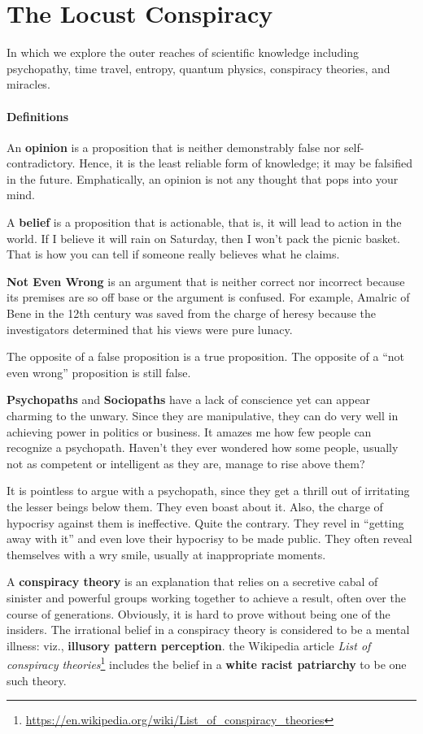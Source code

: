 \section{The Locust Conspiracy}

In which we explore the outer reaches of scientific knowledge including psychopathy, time travel, entropy, quantum
physics, conspiracy theories, and miracles.

\paragraph{Definitions}

An \textbf{opinion} is a proposition that is neither demonstrably false nor self-contradictory. Hence, it is the least
reliable form of knowledge; it may be falsified in the future. Emphatically, an opinion is not any thought that pops
into your mind.

A \textbf{belief} is a proposition that is actionable, that is, it will lead to action in the world. If I believe it
will rain on Saturday, then I won’t pack the picnic basket. That is how you can tell if someone really
believes what he claims.

\textbf{Not Even Wrong} is an argument that is neither correct nor incorrect because its premises are so off base or the
argument is confused. For example, Amalric of Bene in the 12th century was saved from the charge of heresy because the
investigators determined that his views were pure lunacy.

The opposite of a false proposition is a true proposition. The opposite of a “not even wrong” proposition is still
false.

\textbf{Psychopaths} and \textbf{Sociopaths} have a lack of conscience yet can appear charming to the unwary. Since they
are manipulative, they can do very well in achieving power in politics or business. It amazes me how few people can
recognize a psychopath. Haven’t they ever wondered how some people, usually not as competent or intelligent
as they are, manage to rise above them?

It is pointless to argue with a psychopath, since they get a thrill out of irritating the lesser beings below them. They
even boast about it. Also, the charge of hypocrisy against them is ineffective. Quite the contrary. They revel in
“getting away with it” and even love their hypocrisy to be made public. They often reveal themselves with a wry smile,
usually at inappropriate moments.

A \textbf{conspiracy theory} is an explanation that relies on a secretive cabal of sinister and powerful groups working
together to achieve a result, often over the course of generations. Obviously, it is hard to prove without being one of
the insiders. The irrational belief in a conspiracy theory is considered to be a mental illness: viz., \textbf{illusory
pattern perception}. the Wikipedia article \textit{List of conspiracy theories}\footnote{\url{https://en.wikipedia.org/wiki/List_of_conspiracy_theories}} includes the belief in a \textbf{white racist
patriarchy} to be one such theory.

